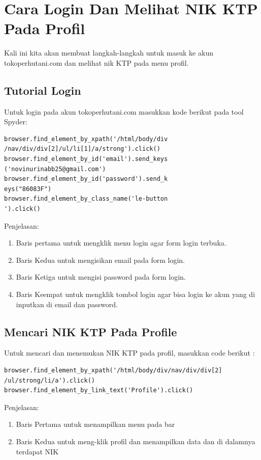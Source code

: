 \newpage
\section{Cara Login Dan Melihat NIK KTP Pada Profil}
Kali ini kita akan membuat langkah-langkah untuk masuk ke akun tokoperhutani.com dan melihat nik KTP pada menu profil.  
\subsection{Tutorial Login}
Untuk login pada akun tokoperhutani.com masukkan kode berikut pada tool Spyder:
\begin{verbatim}
browser.find_element_by_xpath('/html/body/div
/nav/div/div[2]/ul/li[1]/a/strong').click()
browser.find_element_by_id('email').send_keys
('novinurinabb25@gmail.com')
browser.find_element_by_id('password').send_k
eys("86083F")
browser.find_element_by_class_name('le-button
').click()
\end{verbatim}

Penjelasan:
\begin{enumerate}
	\item Baris pertama untuk mengklik menu login agar form login terbuka.
	\item Baris Kedua untuk mengisikan email pada form login. 
	\item Baris Ketiga untuk mengisi password pada form login.
	\item Baris Keempat untuk mengklik tombol login agar bisa login ke akun yang di inputkan di email dan password.
\end{enumerate}

\newpage
\subsection{Mencari NIK KTP Pada Profile}
Untuk mencari dan menemukan NIK KTP pada profil, masukkan code berikut :
\begin{verbatim}
browser.find_element_by_xpath('/html/body/div/nav/div/div[2]
/ul/strong/li/a').click()
browser.find_element_by_link_text('Profile').click()
\end{verbatim}

Penjelasan:
\begin{enumerate}
	\item Baris Pertama untuk menampilkan menu pada bar
	\item Baris Kedua untuk meng-klik profil dan menampilkan data dan di dalamnya terdapat NIK
\end{enumerate}

